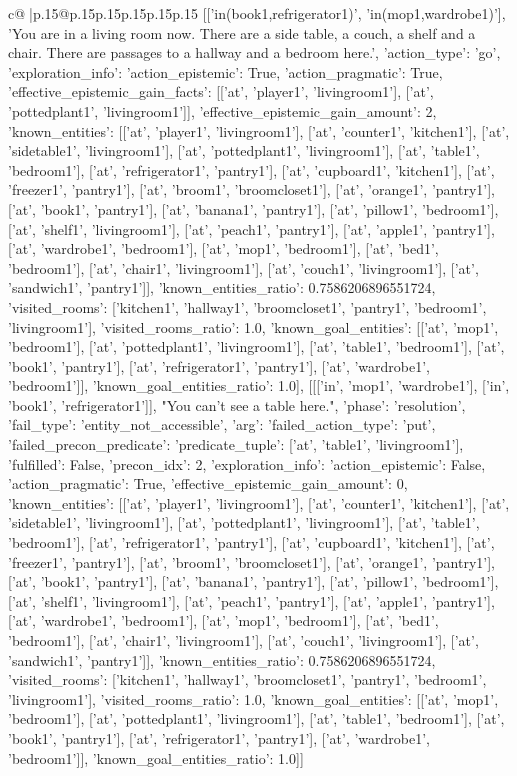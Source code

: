 \documentclass{article}
\begin{document}
{\begin{supertabular}{c@{$\;$}|p{.15\linewidth}@{}p{.15\linewidth}p{.15\linewidth}p{.15\linewidth}p{.15\linewidth}p{.15\linewidth}}
{{{[['in(book1,refrigerator1)', 'in(mop1,wardrobe1)'], 'You are in a living room now. There are a side table, a couch, a shelf and a chair. There are passages to a hallway and a bedroom here.', {'action_type': 'go', 'exploration_info': {'action_epistemic': True, 'action_pragmatic': True, 'effective_epistemic_gain_facts': [['at', 'player1', 'livingroom1'], ['at', 'pottedplant1', 'livingroom1']], 'effective_epistemic_gain_amount': 2, 'known_entities': [['at', 'player1', 'livingroom1'], ['at', 'counter1', 'kitchen1'], ['at', 'sidetable1', 'livingroom1'], ['at', 'pottedplant1', 'livingroom1'], ['at', 'table1', 'bedroom1'], ['at', 'refrigerator1', 'pantry1'], ['at', 'cupboard1', 'kitchen1'], ['at', 'freezer1', 'pantry1'], ['at', 'broom1', 'broomcloset1'], ['at', 'orange1', 'pantry1'], ['at', 'book1', 'pantry1'], ['at', 'banana1', 'pantry1'], ['at', 'pillow1', 'bedroom1'], ['at', 'shelf1', 'livingroom1'], ['at', 'peach1', 'pantry1'], ['at', 'apple1', 'pantry1'], ['at', 'wardrobe1', 'bedroom1'], ['at', 'mop1', 'bedroom1'], ['at', 'bed1', 'bedroom1'], ['at', 'chair1', 'livingroom1'], ['at', 'couch1', 'livingroom1'], ['at', 'sandwich1', 'pantry1']], 'known_entities_ratio': 0.7586206896551724, 'visited_rooms': ['kitchen1', 'hallway1', 'broomcloset1', 'pantry1', 'bedroom1', 'livingroom1'], 'visited_rooms_ratio': 1.0, 'known_goal_entities': [['at', 'mop1', 'bedroom1'], ['at', 'pottedplant1', 'livingroom1'], ['at', 'table1', 'bedroom1'], ['at', 'book1', 'pantry1'], ['at', 'refrigerator1', 'pantry1'], ['at', 'wardrobe1', 'bedroom1']], 'known_goal_entities_ratio': 1.0}}], [[['in', 'mop1', 'wardrobe1'], ['in', 'book1', 'refrigerator1']], "You can't see a table here.", {'phase': 'resolution', 'fail_type': 'entity_not_accessible', 'arg': {'failed_action_type': 'put', 'failed_precon_predicate': {'predicate_tuple': ['at', 'table1', 'livingroom1'], 'fulfilled': False, 'precon_idx': 2}}, 'exploration_info': {'action_epistemic': False, 'action_pragmatic': True, 'effective_epistemic_gain_amount': 0, 'known_entities': [['at', 'player1', 'livingroom1'], ['at', 'counter1', 'kitchen1'], ['at', 'sidetable1', 'livingroom1'], ['at', 'pottedplant1', 'livingroom1'], ['at', 'table1', 'bedroom1'], ['at', 'refrigerator1', 'pantry1'], ['at', 'cupboard1', 'kitchen1'], ['at', 'freezer1', 'pantry1'], ['at', 'broom1', 'broomcloset1'], ['at', 'orange1', 'pantry1'], ['at', 'book1', 'pantry1'], ['at', 'banana1', 'pantry1'], ['at', 'pillow1', 'bedroom1'], ['at', 'shelf1', 'livingroom1'], ['at', 'peach1', 'pantry1'], ['at', 'apple1', 'pantry1'], ['at', 'wardrobe1', 'bedroom1'], ['at', 'mop1', 'bedroom1'], ['at', 'bed1', 'bedroom1'], ['at', 'chair1', 'livingroom1'], ['at', 'couch1', 'livingroom1'], ['at', 'sandwich1', 'pantry1']], 'known_entities_ratio': 0.7586206896551724, 'visited_rooms': ['kitchen1', 'hallway1', 'broomcloset1', 'pantry1', 'bedroom1', 'livingroom1'], 'visited_rooms_ratio': 1.0, 'known_goal_entities': [['at', 'mop1', 'bedroom1'], ['at', 'pottedplant1', 'livingroom1'], ['at', 'table1', 'bedroom1'], ['at', 'book1', 'pantry1'], ['at', 'refrigerator1', 'pantry1'], ['at', 'wardrobe1', 'bedroom1']], 'known_goal_entities_ratio': 1.0}}]] 
}}}
\end{supertabular}}
\end{document}
